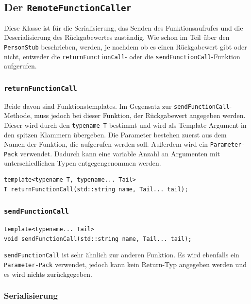\documentclass[a4paper,oneside,10pt]{report}
\begin{document}
\subsection{Der \texttt{RemoteFunctionCaller}}

Diese Klasse ist für die Serialisierung, das Senden des Funktionsaufrufes und die Deserialisierung des Rückgabewertes zuständig. Wie schon im Teil über den \texttt{PersonStub} beschrieben, werden, je nachdem ob es einen Rückgabewert gibt oder nicht, entweder die \texttt{returnFunctionCall}- oder die \texttt{sendFunctionCall}-Funktion aufgerufen. 

\subsubsection{\texttt{returnFunctionCall}}

Beide davon sind Funktionstemplates. Im Gegensatz zur \texttt{sendFunctionCall}-Methode, muss jedoch bei dieser Funktion, der Rückgabewert angegeben werden. Dieser wird durch den \texttt{typename T} bestimmt und wird als Template-Argument in den spitzen Klammern übergeben. Die Parameter bestehen zuerst aus dem Namen der Funktion, die aufgerufen werden soll. Außerdem wird ein \texttt{Parameter-Pack} verwendet. Dadurch kann eine variable Anzahl an Argumenten mit unterschiedlichen Typen entgegengenommen werden. 

\begin{lstlisting}
template<typename T, typename... Tail>
T returnFunctionCall(std::string name, Tail... tail);
\end{lstlisting}

\subsubsection{\texttt{sendFunctionCall}}

\begin{lstlisting}
template<typename... Tail>
void sendFunctionCall(std::string name, Tail... tail);
\end{lstlisting}

\texttt{sendFunctionCall} ist sehr ähnlich zur anderen Funktion. Es wird ebenfalls ein \texttt{Parameter-Pack} verwendet, jedoch kann kein Return-Typ angegeben werden und es wird nichts zurückgegeben. 

\subsubsection{Serialisierung}
\end{document}
